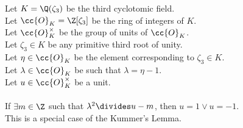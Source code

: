 \begin{theorem}
    \label{lmm:eq_one_or_neg_one_of_unit_of_congruent}
    \leanok
    Let $K = \Q(\zeta_3)$ be the third cyclotomic field. \\
    Let $\cc{O}_K = \Z[\zeta_3]$ be the ring of integers of $K$. \\
    Let $\cc{O}^\times_K$ be the group of units of $\cc{O}_K$. \\
    Let $\zeta_3 \in K$ be any primitive third root of unity. \\
    Let $\eta \in \cc{O}_K$ be the element corresponding to $\zeta_3 \in K$. \\
    Let $\lambda \in \cc{O}_K$ be such that $\lambda = \eta -1$. \\
    Let $u \in \cc{O}^\times_K$ be a unit. \\\\
    If $\exists m \in \Z$ such that $\lambda^2 \divides u - m$, then
    $u = 1 \lor u = -1$. \\
    This is a special case of the Kummer's Lemma.
\end{theorem}
